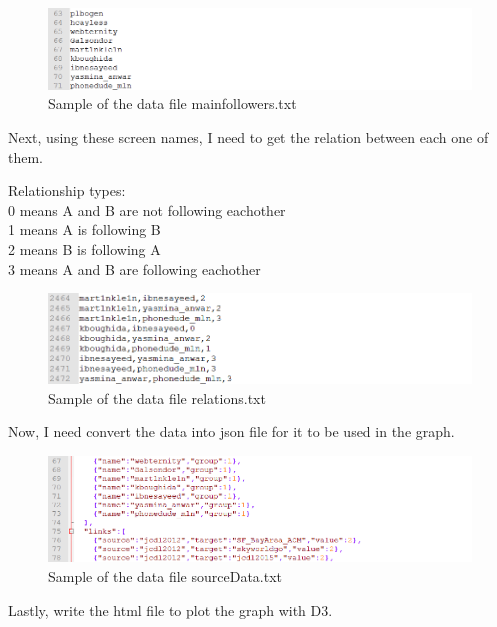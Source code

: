 \documentclass[12pt]{article}
\begin{document}


\begin{figure}[h]
\centering
\includegraphics[width=6.5in]{mainfollowers.png}
\caption{Sample of the data file mainfollowers.txt}
\end{figure}

Next, using these screen names, I need to get the relation between each one of them.



\noindent
Relationship types:\\
0 means A and B are not following eachother\\
1 means A is following B\\
2 means B is following A\\
3 means A and B are following eachother

\begin{figure}[h]
\centering
\includegraphics[width=6.5in]{relations.png}
\caption{Sample of the data file relations.txt}
\end{figure}
\newpage

Now, I need convert the data into json file for it to be used in the graph.

\begin{figure}[h]
\centering
\includegraphics[width=6.5in]{sourceData.png}
\caption{Sample of the data file sourceData.txt}
\end{figure}

Lastly, write the html file to plot the graph with D3.
\end{document}
